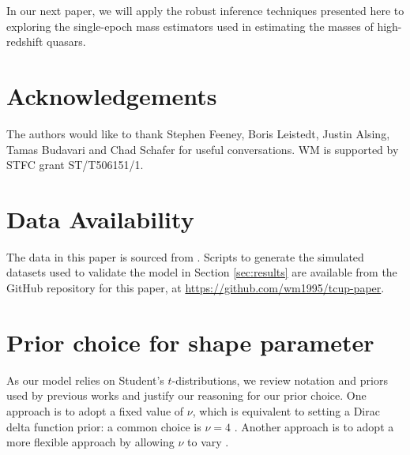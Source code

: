 \documentclass[fleqn,usenatbib]{rasti}
\begin{document}
In our next paper, we will apply the robust inference techniques presented here
to exploring the single-epoch mass estimators used in estimating the masses of
high-redshift quasars. 

\section*{Acknowledgements}

The authors would like to thank Stephen Feeney, Boris Leistedt, Justin Alsing,
Tamas Budavari and Chad Schafer for useful conversations. WM is supported by
STFC grant ST/T506151/1.

\section*{Data Availability}

The data in this paper is sourced from \citet{Kelly:2007, Park:2017}. Scripts to
generate the simulated datasets used to validate the model in Section
\ref{sec:results} are available from the GitHub repository for this paper, at
\url{https://github.com/wm1995/tcup-paper}.







\appendix

\section{Prior choice for shape parameter}
\label{sec:t-prior}

As our model relies on Student's $t$-distributions, we review notation and
priors used by previous works and justify our reasoning for our prior choice.
One approach is to adopt a fixed value of $\nu$, which is equivalent to setting
a Dirac delta function prior: a common choice is $\nu = 4$
\citep[e.g.][]{Berger:1994, Gelman:2013}.  Another approach is to adopt a more
flexible approach by allowing $\nu$ to vary \citep[e.g.][]{Juarez:2010,
Gelman:2013, Ding:2014, Park:2017, Feeney:2018}.
\end{document}
